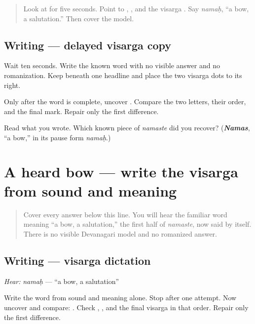 \label{lesson:SA-W03-namah-delayed-copy}



\begin{quote}
Look at \textbf{} for five seconds. Point to \textbf{}, \textbf{}, and the visarga \textbf{}. Say \emph{namaḥ}, “a bow, a salutation.” Then cover the model.
\end{quote}

\subsection*{Writing — delayed visarga copy}
Wait ten seconds. Write the known word with no visible answer and no romanization. Keep \textbf{} beneath one headline and place the two visarga dots to its right.

Only after the word is complete, uncover \textbf{}. Compare the two letters, their order, and the final mark. Repair only the first difference.

\begin{tcolorbox}[breakable,colback=teal!4,colframe=teal!35!black,title={Before you move on}]
Read what you wrote. Which known piece of \emph{namaste} did you recover? (\emph{\textbf{Namas}}, “a bow,” in its pause form \emph{namaḥ}.)
\end{tcolorbox}
\section[\texorpdfstring{\sk{नमः} (namaḥ)}{नमः (namaḥ)}]{A heard bow — write the visarga from sound and meaning}

\label{lesson:SA-W03-namah-dictation}



\begin{quote}
Cover every answer below this line. You will hear the familiar word meaning “a bow, a salutation,” the first half of \emph{namaste}, now said by itself. There is no visible Devanagari model and no romanized answer.
\end{quote}

\subsection*{Writing — visarga dictation}
\emph{Hear:} \emph{namaḥ} — “a bow, a salutation”

Write the word from sound and meaning alone. Stop after one attempt. Now uncover and compare: \textbf{}. Check \textbf{}, \textbf{}, and the final visarga in that order. Repair only the first difference.

